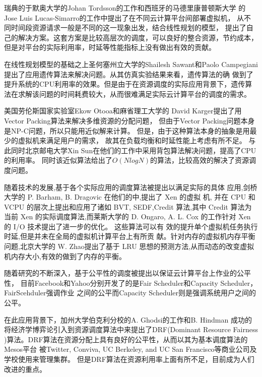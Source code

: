 瑞典的于默奥大学的Johan Tordsson的工作\cite{ref1}和西班牙的马德里康普顿斯大学
的Jose Luis Lucas-Simarro的工作\cite{ref2}中提出了在不同云计算平台间部署虚拟机，
从不同时间段资源请求一般是不同的这一现象出发，结合线性规划的模型，
提出了自己的解决方案。这套方案是比较高层次的调度，可以良好的整合资源，节约成本，
但是对平台的实际利用率，时延等性能指标上没有做出有效的贡献。

在线性规划模型的基础之上圣何塞州立大学的Shailesh Sawant\cite{ref10}和Paolo Campegiani\cite{ref11}
提出了应用遗传算法来解决问题。从其仿真实验结果来看，遗传算法的确
做到了提升系统的CPU利用率的效果。但是由于在资源调度的实际应用背景下，遗传算
法在求解该问题的时间耗费较大，从而很难满足实际云计算平台的调度的需求。

美国劳伦斯国家实验室Ekow Otooa\cite{ref12}和麻省理工大学的
David Karger\cite{ref13}提出了用Vector Packing算法来解决多维资源的分配问题，
但由于Vector Packing问题本身是NP-C问题，所以只能用近似解来计算。
但是，由于这种算法本身的抽象是用最少的虚拟机来满足用户的需求，
故其在负载均衡和时延性能上考虑有所不足。
与此同时北京邮电大学Xin Sun\cite{ref7}在他们的工作中采用背包算法解决问题，提高了CPU的利用率。
同时该近似算法给出了$O(NlogN)$的算法，比较高效的解决了资源调度问题。

随着技术的发展,基于各个实际应用的调度算法被提出以满足实际的具体 应用,剑桥大学的 P. Barham, B. Dragovic 在他们的\cite{ref8}中,提出了 Xen 的虚拟 机,
并在 CPU 和 VCPU 的层次上提出和应用了诸如 BVT\cite{ref14},
SEDF,Credit 算法,其中 Credit 算法为当前 Xen 的实际调度算法,而莱斯大学的 D. Ongaro, A. L. Cox 的工作针对 Xen 的 I/O\cite{ref4} 技术提出了进一步的优化。
这些算法可以有 效的提升单个虚拟机任务执行时延,但是并未在全局的虚拟机计算平台上有所贡 献。针对内存的虚拟机内存平衡问题,北京大学的
 W. Zhao\cite{ref7}提出了基于 LRU 思想的预测方法,从而动态的改变虚拟机内存大小,有效的做到了内存的平衡。


随着研究的不断深入，基于公平性\cite{ref9}的调度被提出以保证云计算平台上作业的公平性，
目前Facebook和Yahoo分别开发了的是Fair Scheduler和Capacity Scheduler\cite{ref17}，FairScehduler\cite{ref16}强调作业
之间的公平而Capacity Scheduler则是强调系统用户之间的公平。

在此应用背景下，加州大学伯克利分校的A. Ghodsi\cite{ref5}的工作和B. Hindman\cite{ref6}
成功的将经济学博弈论引入到资源调度算法中来提出了DRF(Dominant Resource Fairness
)算法。DRF算法在资源分配上具有良好的公平性，从而以其为基本调度算法的Mesos平台
被Twitter, Conviva, UC Berkeley, and UC San Francisco等商业公司及学校使用来管理集群。
但是DRF算法在资源利用率上面有所不足，目前成为人们改进的重点。

